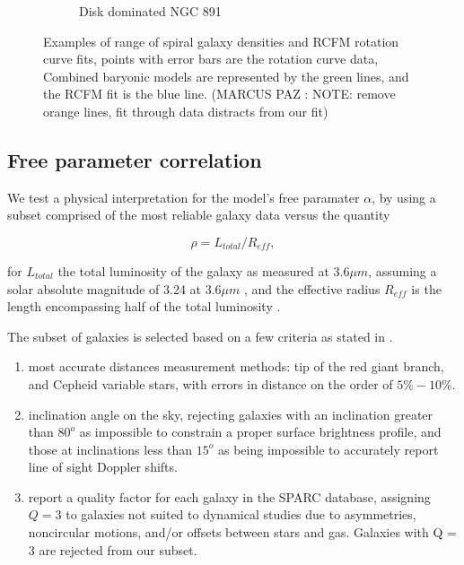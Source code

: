 \documentclass[reprint,%
 amsmath,amssymb,
 aps,
]{revtex4-1}
\begin{document}
\begin{figure}[ht]
\begin{subfigure}[c]{0.5\linewidth}
    \caption{Disk dominated NGC 891} 
    \label{fig25:e} 
  \end{subfigure}%
  \caption{Examples of range of spiral galaxy densities and RCFM rotation curve fits, points with error bars are the rotation curve data, Combined baryonic models are represented by the green lines, and the RCFM fit is the blue line. (MARCUS PAZ : NOTE: remove orange lines, fit through data distracts from our fit)  }
  \label{fig25} 
\end{figure}


\subsection{Free parameter correlation }

We test a  physical interpretation  for the  model's free paramater $\alpha$,  by using a subset comprised of the most reliable galaxy data versus the quantity
  
   \begin{equation}
     \rho = L_{total}/R_{eff}, 
 \end{equation}
 
 for  $L_{total}$    the  total luminosity of the galaxy as measured  at $3.6 \mu m$,  assuming a solar
absolute magnitude of 3.24 at $3.6 \mu m$ \cite{oh2008high}, and the effective radius $R_{eff}$ is    the length encompassing half of the total luminosity \cite{2016Lelli}. 

 
 
The
  subset of galaxies is selected  based on a few criteria as stated in \citet{2016Lelli}. 
  \begin{enumerate}
      \item most   accurate distances measurement methods:   tip of the red giant branch, and Cepheid variable stars,  with errors in distance on the order of $5\% - 10\%$. \\
      \item  inclination angle on the sky, rejecting galaxies with an inclination  greater than $80^o$ as impossible to constrain a proper surface brightness profile, and those at inclinations less than $15^o$ as being impossible to accurately report line of sight Doppler shifts.
      \item  \citet{2016Lelli}   report a quality factor for each galaxy in the SPARC database, assigning  $Q=3$ to galaxies not suited to dynamical studies due to     asymmetries,  noncircular motions, and/or offsets between stars and gas. Galaxies with Q = 3 are rejected from our subset.
  \end{enumerate}
   
\end{document}
